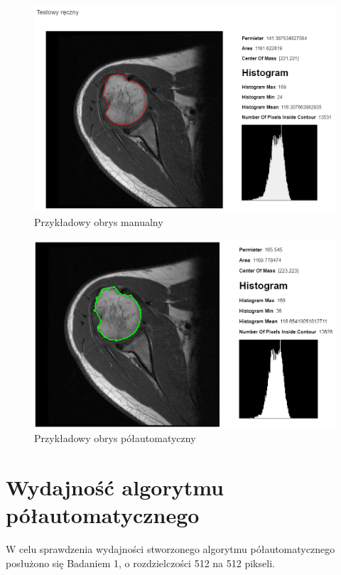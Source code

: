 \documentclass[a4paper,11pt,twoside,openright]{report}
\theoremstyle{definition}
\begin{document}
\begin{figure}[p]
	\center
	\includegraphics[width=1\textwidth]{105}
	\caption{Przykładowy obrys manualny}
    	\label{fig:105}
\end{figure}

\begin{figure}[p]
	\center
	\includegraphics[width=1\textwidth]{107}
	\caption{Przykładowy obrys półautomatyczny}
    	\label{fig:107}
\end{figure}



\section {Wydajność algorytmu półautomatycznego}

W celu sprawdzenia wydajności stworzonego algorytmu półautomatycznego posłużono
się Badaniem 1, o rozdzielczości 512 na 512 pikseli.
\end{document}
